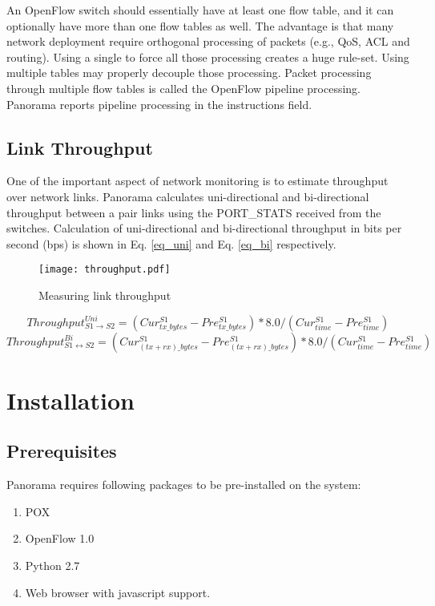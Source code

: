 \documentclass[11pt,a4paper]{report}
\begin{document}
An OpenFlow switch should essentially have at least one flow table, and it can optionally have more than one flow tables as well. The advantage is that many network deployment require orthogonal processing of packets (e.g., QoS, ACL and routing). Using a single to force all those processing creates a huge rule-set. Using multiple tables may properly decouple those processing. Packet processing through multiple flow tables is called the OpenFlow pipeline processing. Panorama reports pipeline processing in the instructions field.
	
	\section{Link Throughput}
	One of the important aspect of network monitoring is to estimate throughput over network links. Panorama calculates uni-directional and bi-directional throughput between a pair links using the PORT\_STATS received from the switches. Calculation of uni-directional and bi-directional throughput in bits per second (bps) is shown in Eq. \ref{eq_uni} and Eq. \ref{eq_bi} respectively. 
		\begin{figure}[!htbp]
			\centering
			\texttt{[image: throughput.pdf]}
			\caption[]{Measuring link throughput}
		\end{figure}
		\begin{equation}
		\label{eq_uni}
		Throughput^{Uni}_{S1 \rightarrow S2} = (Cur_{tx\_bytes}^{S1} - Pre_{tx\_bytes}^{S1}) * 8.0 / (Cur_{time}^{S1} - Pre_{time}^{S1})
		\end{equation}
		\begin{equation}
		\label{eq_bi}		
		Throughput^{Bi}_{S1 \leftrightarrow S2} = (Cur^{S1}_{(tx + rx)\_bytes} - Pre^{S1}_{(tx + rx)\_bytes}) * 8.0 / (Cur^{S1}_{time} - Pre^{S1}_{time})
		\end{equation}

	\chapter{Installation}
	\section{Prerequisites}
	Panorama requires following packages to be pre-installed on the system:
	\begin{enumerate}
		\item POX \cite{POX}
		\item OpenFlow 1.0
		\item Python 2.7
		\item Web browser with javascript support.
	\end{enumerate}
\end{document}

